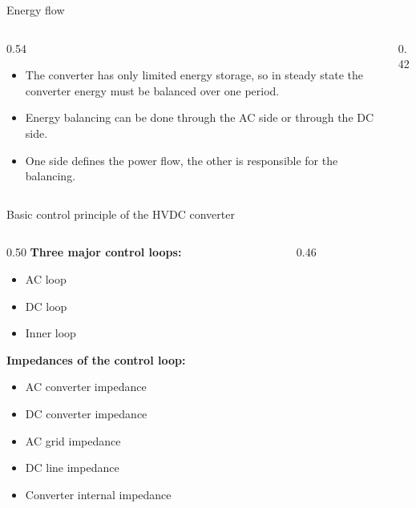 \begin{frame}{Energy flow}
  \begin{columns}[c,onlytextwidth]
    \begin{column}{0.54\textwidth}
      \begin{itemize}
        \setlength{\itemsep}{0.5em}
        \item The converter has only limited energy storage, so in steady
              state the converter energy must be balanced over one period.
        \item Energy balancing can be done through the AC side or through
              the DC side.
        \item One side defines the power flow, the other is responsible for
              the balancing.
      \end{itemize}
    \end{column}
    \begin{column}{0.42\textwidth}
      \centering
      \\[0.6em]
    \end{column}
  \end{columns}
\end{frame}

\begin{frame}{Basic control principle of the HVDC converter}
  \begin{columns}[c,onlytextwidth]
    \begin{column}{0.50\textwidth}
      \textbf{Three major control loops:}
      \begin{itemize}
        \setlength{\itemsep}{0.25em}
        \item AC loop
        \item DC loop
        \item Inner loop
      \end{itemize}
      \vspace{0.5em}
      \textbf{Impedances of the control loop:}
      \begin{itemize}
        \setlength{\itemsep}{0.2em}
        \item AC converter impedance
        \item DC converter impedance
        \item AC grid impedance
        \item DC line impedance
        \item Converter internal impedance
      \end{itemize}
    \end{column}
    \begin{column}{0.46\textwidth}
      \centering
    \end{column}
  \end{columns}
\end{frame}

